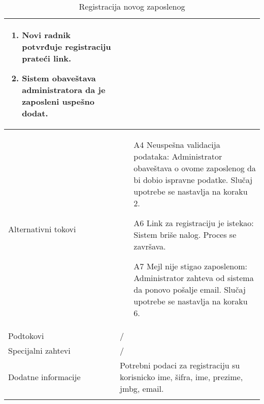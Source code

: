 \documentclass[../main.tex]{subfiles}
\begin{document}
\begin{longtable}{| p{} | p{} |}
\begin{enumerate}
        \item Novi radnik potvrđuje registraciju prateći link.
        \item Sistem obaveštava administratora da je zaposleni uspešno dodat.
    \end{enumerate}\\
\hline
    Alternativni tokovi & \begin{itemize}
        \item[A4] Neuspešna validacija podataka: Administrator obaveštava o ovome zaposlenog da bi dobio ispravne podatke. Slučaj upotrebe se nastavlja na koraku 2.
        \item[A6] Link za registraciju je istekao: Sistem briše nalog. Proces se završava.
        \item[A7] Mejl nije stigao zaposlenom: Administrator zahteva od sistema da ponovo pošalje email. Slučaj upotrebe se nastavlja na koraku 6.

    \end{itemize}\\
\hline
    Podtokovi & /\\
\hline
    Specijalni zahtevi & /\\
\hline
    Dodatne informacije & Potrebni podaci za registraciju su korisnicko ime, šifra, ime, prezime, jmbg, email.\\
\hline
\caption{Registracija novog zaposlenog} %
\end{longtable}
\end{document}
